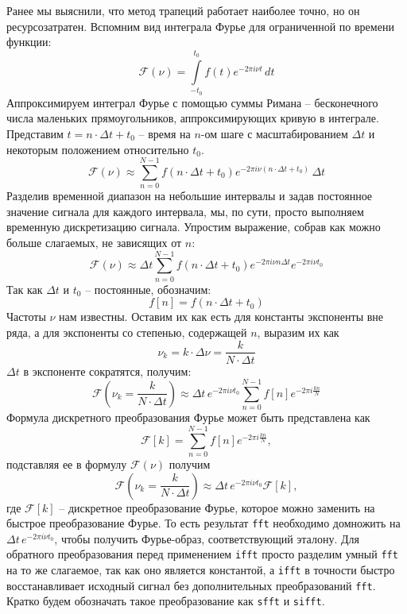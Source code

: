 \documentclass[a4paper, 12pt]{article}
\begin{document}
    Ранее мы выяснили, что метод трапеций работает наиболее точно, но он ресурсозатратен.
    Вспомним вид интеграла Фурье для ограниченной по времени функции:
    $$
    \mathcal{F}(\nu)=\int\limits_{-t_0}^{t_0}f(t)e^{-2\pi i \nu t}\,dt
    $$
    Аппроксимируем интеграл Фурье с помощью суммы Римана -- бесконечного числа маленьких прямоугольников,
    аппроксимирующих кривую в интеграле. Представим $t=n\cdot \Delta t + t_0$ -- время на $n$-ом шаге с масштабированием $\Delta t$
    и некоторым положением относительно $t_0$.
    $$
    \mathcal{F}(\nu)\approx \sum\limits_{n=0}^{N-1}f(n\cdot \Delta t + t_0)e^{-2\pi i \nu (n\cdot \Delta t + t_0)}\,\Delta t
    $$
    Разделив временной диапазон на небольшие интервалы и задав постоянное значение сигнала для каждого интервала,
    мы, по сути, просто выполняем временную дискретизацию сигнала. Упростим выражение, собрав как можно больше слагаемых,
    не зависящих от $n$:
    $$
    \mathcal{F}(\nu)\approx \Delta t \sum\limits_{n=0}^{N-1}f(n\cdot \Delta t + t_0)e^{-2\pi i \nu n\Delta t}e^{-2\pi i \nu t_0}
    $$
    Так как $\Delta t$ и $t_0$ -- постоянные, обозначим:
    $$
    f[n]=f(n\cdot\Delta t + t_0)
    $$
    Частоты $\nu$ нам известны. Оставим их как есть для константы экспоненты вне ряда, а для экспоненты со степенью, содержащей $n$, выразим
    их как
    $$
    \nu_k=k\cdot\Delta \nu=\dfrac{k}{N\cdot\Delta t}
    $$
    $\Delta t$ в экспоненте сократятся, получим:
    $$
    \mathcal{F}\left(\nu_k=\frac{k}{N\cdot\Delta t}\right)\approx \Delta t\,e^{-2\pi i \nu t_0} \sum\limits_{n=0}^{N-1}f[n]e^{-2\pi i \frac{kn}{N}}
    $$
    Формула дискретного преобразования Фурье может быть представлена как
    $$
    \mathcal{F}[k]=\sum\limits_{n=0}^{N-1}f[n]e^{-2\pi i \frac{kn}{N}},
    $$
    подставляя ее в формулу $\mathcal{F}(\nu)$ получим
    $$
    \mathcal{F}\left(\nu_k=\dfrac{k}{N\cdot\Delta t}\right)\approx\Delta t\,e^{-2\pi i \nu t_0}\mathcal{F}[k],
    $$
    где $\mathcal{F}[k]$ -- дискретное преобразование Фурье, которое можно заменить на быстрое преобразование Фурье.
    То есть результат \texttt{fft} необходимо домножить на $\Delta t\,e^{-2\pi i \nu t_0}$, чтобы получить Фурье-образ,
    соответствующий эталону. Для обратного преобразования перед применением \texttt{ifft} просто разделим умный \texttt{fft}
    на то же слагаемое, так как оно является константой, а \texttt{ifft} в точности быстро восстанавливает исходный сигнал без
    дополнительных преобразований \texttt{fft}. Кратко будем обозначать такое преобразование как \texttt{sfft} и \texttt{sifft}.
\end{document}
